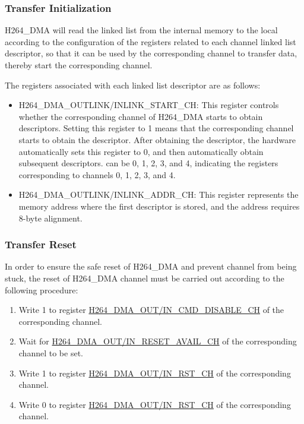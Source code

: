 \documentclass[main\_\_EN.tex]{subfiles}
\begin{document}
\subsubsection{Transfer Initialization}\label{sec:h264-dma-start}
H264\_DMA will read the linked list from the internal memory to the local according to the configuration of the registers related to each channel linked list descriptor, so that it can be used by the corresponding channel to transfer data, thereby start the corresponding channel.

The registers associated with each linked list descriptor are as follows:
\begin{itemize}
    \item H264\_DMA\_OUTLINK/INLINK\_START\_CH: This register controls whether the corresponding channel of H264\_DMA starts to obtain descriptors. Setting this register to 1 means that the corresponding channel starts to obtain the descriptor. After obtaining the descriptor, the hardware automatically sets this register to 0, and then automatically obtain subsequent descriptors.  can be 0, 1, 2, 3, and 4, indicating the registers corresponding to channels 0, 1, 2, 3, and 4.
    \item H264\_DMA\_OUTLINK/INLINK\_ADDR\_CH: This register represents the memory address where the first descriptor is stored, and the address requires 8-byte alignment.
\end{itemize}


\subsubsection{Transfer Reset}\label{sec:h264-dma-reset}
In order to ensure the safe reset of H264\_DMA and prevent channel from being stuck, the reset of H264\_DMA channel must be carried out according to the following procedure:
\begin{enumerate}
    \item Write 1 to register \hyperref[fielddesc:H264DMAOUTCMDDISABLECH0]{H264\_DMA\_OUT/IN\_CMD\_DISABLE\_CH} of the corresponding channel.
    \item Wait for \hyperref[fielddesc:H264DMAOUTRESETAVAILCH0]{H264\_DMA\_OUT/IN\_RESET\_AVAIL\_CH} of the corresponding channel to be set.
    \item Write 1 to register \hyperref[fielddesc:H264DMAOUTRSTCH0]{H264\_DMA\_OUT/IN\_RST\_CH} of the corresponding channel.
    \item Write 0 to register \hyperref[fielddesc:H264DMAOUTRSTCH0]{H264\_DMA\_OUT/IN\_RST\_CH} of the corresponding channel.
\end{enumerate}
\end{document}
